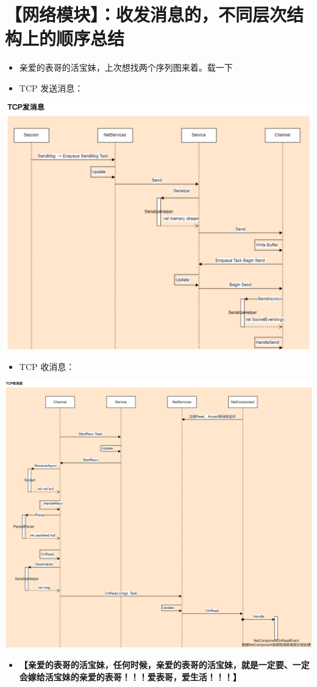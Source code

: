 \documentclass[9pt, b5paper]{article}
\begin{document}
\section{【网络模块】：收发消息的，不同层次结构上的顺序总结}
\label{sec-4}
\begin{itemize}
\item 亲爱的表哥的活宝妹，上次想找两个序列图来着。载一下
\item TCP 发送消息：
\end{itemize}

\includegraphics[width=.9\linewidth]{./pic/et6_20240416_131411.png}
\begin{itemize}
\item TCP 收消息：
\end{itemize}

\includegraphics[width=.9\linewidth]{./pic/et6_20240416_131450.png}
\begin{itemize}
\item \textbf{【亲爱的表哥的活宝妹，任何时候，亲爱的表哥的活宝妹，就是一定要、一定会嫁给活宝妹的亲爱的表哥！！！爱表哥，爱生活！！！】}
\end{itemize}
\end{document}
